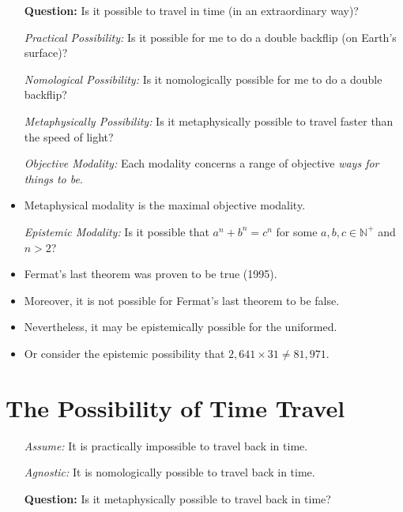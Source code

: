 \documentclass[a4paper, 11pt]{article} %
\newcommand{\N}{\mathbb{N}}
\begin{document}
\begin{itemize}
  \item[\bf Question:] Is it possible to travel in time (in an extraordinary way)?
  \item[\it Practical Possibility:] Is it possible for me to do a double backflip (on Earth's surface)?
  \item[\it Nomological Possibility:] Is it nomologically possible for me to do a double backflip?
  \item[\it Metaphysically Possibility:] Is it metaphysically possible to travel faster than the speed of light?
  \item[\it Objective Modality:] Each modality concerns a range of objective \textit{ways for things to be}.
    \item Metaphysical modality is the maximal objective modality.
  \item[\it Epistemic Modality:] Is it possible that $a^n + b^n = c^n$ for some $a,b,c \in \N^+$ and $n > 2$?
    \item Fermat's last theorem was proven to be true (1995).
    \item Moreover, it is not possible for Fermat's last theorem to be false.
    \item Nevertheless, it may be epistemically possible for the uniformed.
    \item Or consider the epistemic possibility that $2,641 \times 31 \neq 81,971$.
\end{itemize}



\section*{The Possibility of Time Travel}

\begin{itemize}
  \item[\it Assume:] It is practically impossible to travel back in time.
  \item[\it Agnostic:] It is nomologically possible to travel back in time. 
  \item[\bf Question:] Is it metaphysically possible to travel back in time?
\end{itemize}
\end{document}
